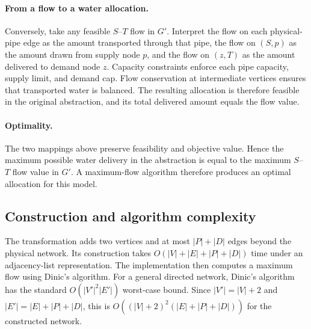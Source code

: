 \paragraph{From a flow to a water allocation.}
Conversely, take any feasible $S$--$T$ flow in $G'$. Interpret the flow
on each physical-pipe edge as the amount transported through that pipe,
the flow on $(S,p)$ as the amount drawn from supply node $p$, and the
flow on $(z,T)$ as the amount delivered to demand node $z$. Capacity
constraints enforce each pipe capacity, supply limit, and demand cap.
Flow conservation at intermediate vertices ensures that transported water
is balanced. The resulting allocation is therefore feasible in the original
abstraction, and its total delivered amount equals the flow value.

\paragraph{Optimality.}
The two mappings above preserve feasibility and objective value. Hence the
maximum possible water delivery in the abstraction is equal to the maximum
$S$--$T$ flow value in $G'$. A maximum-flow algorithm therefore produces
an optimal allocation for this model.

\subsection{Construction and algorithm complexity}
The transformation adds two vertices and at most $|P|+|D|$ edges beyond
the physical network. Its construction takes
$O(|V|+|E|+|P|+|D|)$ time under an adjacency-list representation.
The implementation then computes a maximum flow using Dinic's algorithm.
For a general directed network, Dinic's algorithm has the standard
$O(|V'|^2|E'|)$ worst-case bound. Since $|V'|=|V|+2$ and
$|E'|=|E|+|P|+|D|$, this is
$O((|V|+2)^2(|E|+|P|+|D|))$ for the constructed network.